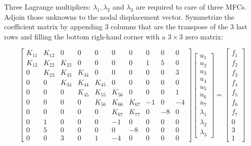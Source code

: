 Three Lagrange multipliers: $ \lambda_1, \lambda_2 $ and $ \lambda_3 $ are
required to care of three MFCs. Adjoin those unknowns to the nodal displacement
vector. Symmetrize the coefficient matrix by appending 3 columns that are the
transpose of the 3 last rows and filling the bottom righ-hand corner with
a $ 3 \times 3 $ zero matrix:

\begin{equation}
    \begin{bmatrix}
        K_{11} & K_{12} & 0 & 0 & 0 & 0 & 0 & 0 & 0 & 0 \\
        K_{12} & K_{22} & K_{23} & 0 & 0 & 0 & 0 & 1 & 5 & 0 \\
        0 & K_{23} & K_{33} & K_{34} & 0 & 0 & 0 & 0 & 0 & 3 \\
        0 & 0 & K_{34} & K_{44} & K_{45} & 0 & 0 & 0 & 0 & 0 \\
        0 & 0 & 0 & K_{45} & K_{55} & K_{56} & 0 & 0 & 0 & 1 \\
        0 & 0 & 0 & 0 & K_{56} & K_{66} & K_{67} & -1 & 0 & -4 \\
        0 & 0 & 0 & 0 & 0 & K_{67} & K_{77} & 0 & -8 & 0 \\
        0 & 1 & 0 & 0 & 0 & -1 & 0 & 0 & 0 & 0 \\
        0 & 5 & 0 & 0 & 0 & 0 & -8 & 0 & 0 & 0 \\
        0 & 0 & 3 & 0 & 1 & -4 & 0 & 0 & 0 & 0
    \end{bmatrix}
    \begin{bmatrix}
        u_1 \\
        u_2 \\
        u_3 \\
        u_4 \\
        u_5 \\
        u_6 \\
        u_7 \\
        \lambda_1 \\
        \lambda_2 \\
        \lambda_3
    \end{bmatrix}
    = \begin{bmatrix}
        f_1 \\
        f_2 \\
        f_3 \\
        f_4 \\
        f_5 \\
        f_6 \\
        f_7 \\
        0 \\
        3 \\
        1
    \end{bmatrix}
\end{equation}


